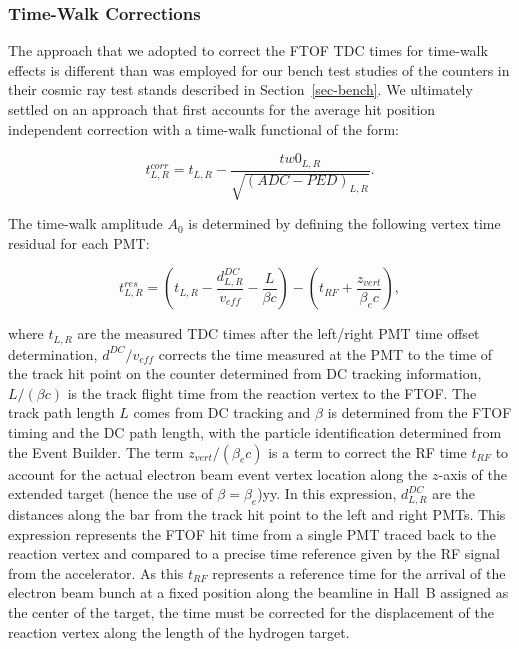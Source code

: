 \documentclass{elsart}
\begin{document}
\subsubsection{Time-Walk Corrections}
\label{sec-tw}

The approach that we adopted to correct the FTOF TDC times for time-walk effects is different than
was employed for our bench test studies of the counters in their cosmic ray test stands described in
Section~\ref{sec-bench}. We ultimately settled on an approach that first accounts for the average hit
position independent correction with a time-walk functional of the form:

\begin{equation}
\label{tw-func}
t^{corr}_{L,R} = t_{L,R} - \frac{tw0_{L,R}}{\sqrt{(ADC - PED)_{L,R}}}.
\end{equation}

The time-walk amplitude $A_0$ is determined by defining the following vertex time residual for each PMT:

\begin{equation}
\label{tres}
t_{L,R}^{res} = \left(t_{L,R} - \frac{d_{L,R}^{DC}}{v_{eff}} - \frac{L}{\beta c} \right) 
- \left( t_{RF} + \frac{z_{vert}}{\beta_e c} \right),
\end{equation}

\noindent
where $t_{L,R}$ are the measured TDC times after the left/right PMT time offset determination, 
$d^{DC}/v_{eff}$ corrects the time measured at the PMT to the time of the track hit point
on the counter determined from DC tracking information, $L/(\beta c)$ is the track flight time
from the reaction vertex to the FTOF. The track path length $L$ comes from DC tracking
and $\beta$ is determined from the FTOF timing and the DC path length, with the particle
identification determined from the Event Builder. The term $z_{vert}/(\beta_e c)$ is a term to
correct the RF time $t_{RF}$ to account for the actual electron beam event vertex location along
the $z$-axis of the extended target (hence the use of $\beta = \beta_e$)yy. In this expression,
$d_{L,R}^{DC}$ are the distances along the bar from the track hit point to the left and right PMTs.
This expression represents the FTOF hit time from a single PMT traced back to the reaction
vertex and compared to a precise time reference given by the RF signal from the accelerator.
As this $t_{RF}$ represents a reference time for the arrival of the electron beam bunch at a fixed
position along the beamline in Hall~B assigned as the center of the target, the time must be
corrected for the displacement of the reaction vertex along the length of the hydrogen target.
\end{document}
